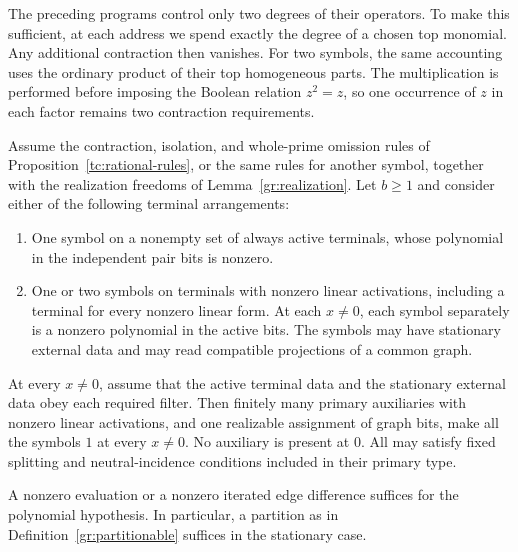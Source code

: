 The preceding programs control only two degrees of their operators.
To make this sufficient, at each address we spend exactly the degree
of a chosen top monomial.  Any additional contraction then vanishes.
For two symbols, the same accounting uses the ordinary product of their
top homogeneous parts. The multiplication is performed before imposing
the Boolean relation $z^2=z$, so one occurrence of $z$ in each factor
remains two contraction requirements.

\begin{theorem}\label{gr:address}
Assume the contraction, isolation, and whole-prime omission rules of
Proposition~\ref{tc:rational-rules}, or the same rules for another
symbol, together with the realization freedoms of
Lemma~\ref{gr:realization}.  Let $b\ge1$ and
consider either of the following terminal arrangements:
\begin{enumerate}
\item One symbol on a nonempty set of always active terminals, whose
polynomial in the independent pair bits is nonzero.
\item One or two symbols on terminals with nonzero linear activations,
including a terminal for every nonzero linear form.  At each $x\ne0$,
each symbol separately is a nonzero polynomial in the active bits.
The symbols may have stationary external data and may read compatible
projections of a common graph.
\end{enumerate}
At every $x\ne0$, assume that the active terminal data and the stationary
external data obey each required filter.  Then finitely many primary
auxiliaries with nonzero linear activations, and one realizable assignment
of graph bits, make all the symbols $1$ at every $x\ne0$.  No auxiliary
is present at $0$.  All may satisfy fixed splitting and neutral-incidence
conditions included in their primary type.

A nonzero evaluation or a nonzero iterated edge difference suffices for
the polynomial hypothesis.  In particular, a partition as in
Definition~\ref{gr:partitionable} suffices in the stationary case.
\end{theorem}

